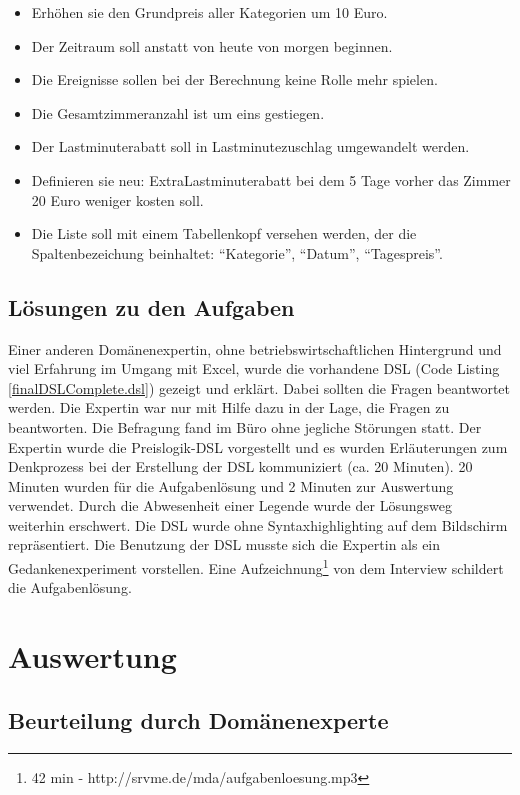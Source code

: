 \documentclass[11pt,english,ngerman, headsepline]{scrreprt}
\begin{document}
\begin{itemize} 
\item Erhöhen sie den Grundpreis aller Kategorien um 10 Euro. 
\item Der Zeitraum soll anstatt von heute von morgen beginnen.
\item Die Ereignisse sollen bei der Berechnung keine Rolle mehr spielen.
\item Die Gesamtzimmeranzahl ist um eins gestiegen.
\item Der Lastminuterabatt soll in Lastminutezuschlag umgewandelt werden.
\item Definieren sie neu: ExtraLastminuterabatt bei dem 5 Tage vorher
das Zimmer 20 Euro weniger kosten soll. 
\item Die Liste soll mit einem Tabellenkopf versehen werden, der die
Spaltenbezeichung beinhaltet: ``Kategorie'', ``Datum'', ``Tagespreis''. 
\end{itemize}

\section{Lösungen zu den Aufgaben}

Einer anderen Domänenexpertin, ohne betriebswirtschaftlichen Hintergrund und
viel Erfahrung im Umgang mit Excel, wurde die vorhandene DSL (Code Listing
\ref{finalDSLComplete.dsl}) gezeigt und erklärt.
Dabei sollten die Fragen beantwortet werden. Die Expertin war nur mit Hilfe dazu
in der Lage, die Fragen zu beantworten.
Die Befragung fand im Büro ohne jegliche Störungen statt. Der Expertin wurde die
Preislogik-DSL vorgestellt und es wurden Erläuterungen zum Denkprozess bei der
Erstellung der DSL kommuniziert (ca. 20 Minuten). 20 Minuten wurden für die
Aufgabenlösung und 2 Minuten zur Auswertung verwendet. Durch die Abwesenheit
einer Legende wurde der Lösungsweg weiterhin erschwert. Die DSL wurde ohne
Syntaxhighlighting auf dem Bildschirm repräsentiert. Die Benutzung
der DSL musste sich die Expertin als ein Gedankenexperiment
vorstellen.
Eine Aufzeichnung\footnote{42 min - http://srvme.de/mda/aufgabenloesung.mp3} von dem Interview schildert die Aufgabenlösung.


  
\chapter{Auswertung}
  

\section{Beurteilung durch Domänenexperte}\label{reaktionExperte}
\end{document}
